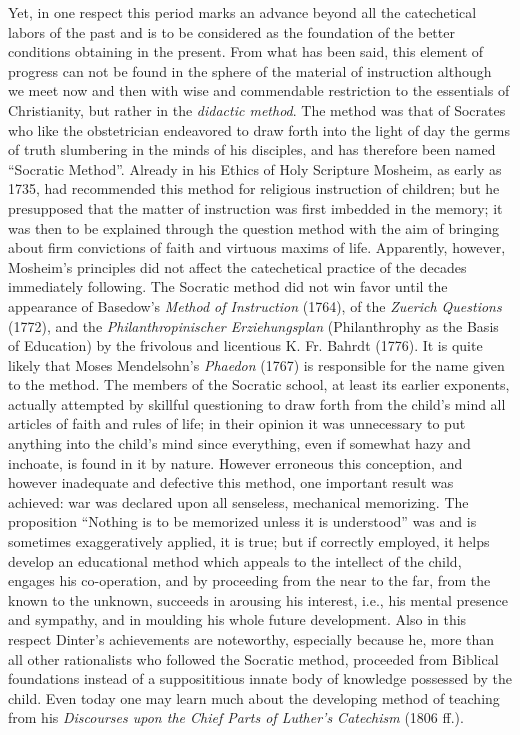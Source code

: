 Yet, in one respect this period marks an advance beyond all the catechetical labors of the past and is to be considered as the foundation of the better conditions obtaining in the present. From what has been said, this element of progress can not be found in the sphere of the material of instruction although we meet now and then with wise and commendable restriction to the essentials of Christianity, but rather in the \emph{didactic method}. The method was that of Socrates who like the obstetrician endeavored to draw forth into the light of day the germs of truth slumbering in the minds of his disciples, and has therefore been named “Socratic Method”. Already in his Ethics of Holy Scripture Mosheim, as early as 1735, had recommended this method for religious instruction of children; but he presupposed that the matter of instruction was first imbedded in the memory; it was then to be explained through the question method with the aim of bringing about firm convictions of faith and virtuous maxims of life. Apparently, however, Mosheim’s principles did not affect the catechetical practice of the decades immediately following. The Socratic method did not win favor until the appearance of Basedow’s \emph{Method of Instruction} (1764), of the \emph{Zuerich Questions} (1772), and the \emph{Philanthropinischer Erziehungsplan} (Philanthrophy as the Basis of Education) by the frivolous and licentious K. Fr. Bahrdt (1776). It is quite likely that Moses Mendelsohn’s \emph{Phaedon} (1767) is responsible for the name given to the method. The members of the Socratic
school, at least its earlier exponents, actually attempted by skillful questioning to draw forth from the child’s mind all articles of faith and rules of life; in their opinion it was unnecessary to put anything into the child’s mind since everything, even if somewhat hazy and inchoate, is found in it by nature. However erroneous this conception, and however inadequate and defective this method, one important result was achieved: war was declared upon all senseless, mechanical memorizing. The proposition “Nothing is to be memorized unless it is understood” was and is sometimes exaggeratively applied, it is true; but if correctly employed, it helps develop an educational method which appeals to the intellect of the child, engages his co-operation, and by proceeding from the near to the far, from the known to the unknown, succeeds in arousing his interest, i.e., his mental presence and sympathy, and in moulding his whole future development. Also in this respect Dinter’s achievements are noteworthy, especially because he, more than all other rationalists who followed the Socratic method, proceeded from Biblical foundations instead of a supposititious innate body of knowledge possessed by the child. Even today one may learn much about the developing method of teaching from his \emph{Discourses upon the Chief Parts of Luther’s Catechism} (1806 ff.).

